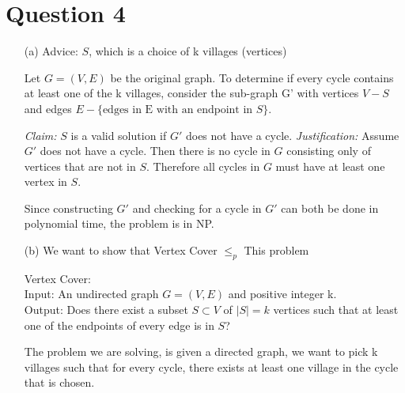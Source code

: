 \documentclass{article}
\begin{document}
\section{Question 4}
\begin{enumerate}
    \item[(a)]Advice: $S$, which is a choice of k villages (vertices)
    
    Let $G = (V, E)$ be the original graph. To determine if every cycle contains at least one of the k villages, consider the sub-graph G' with vertices $V - S$ and edges $E - \{\text{edges in E with an endpoint in }S\}$.
    
    \emph{Claim:} $S$ is a valid solution if $G'$ does not have a cycle. \emph{Justification:} Assume $G'$ does not have a cycle. Then there is no cycle in $G$ consisting only of vertices that are not in $S$. Therefore all cycles in $G$ must have at least one vertex in $S$.
    
    Since constructing $G'$ and checking for a cycle in $G'$ can both be done in polynomial time, the problem is in NP.
    
    \item[(b)] We want to show that Vertex Cover $\leq_p$ This problem
    
    Vertex Cover:\\
    Input: An undirected graph $G = (V,E)$ and positive integer k.\\
    Output: Does there exist a subset $S \subset V$ of $|S| = k$ vertices such that at least one of the endpoints of every edge is in $S$?
    
    The problem we are solving, is given a directed graph, we want to pick k villages such that for every cycle, there exists at least one village in the cycle that is chosen.\\
    

\end{enumerate}
\end{document}
